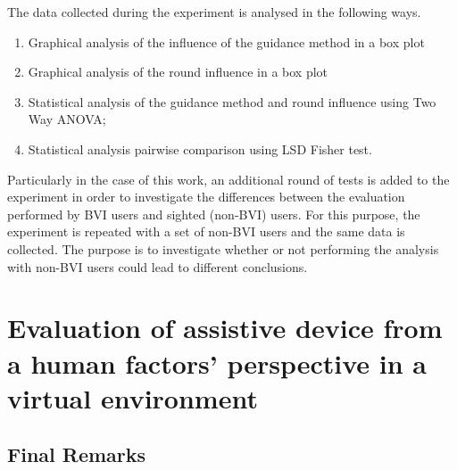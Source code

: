 The data collected during the experiment is analysed in the following ways. 

\begin{enumerate}
    \item Graphical analysis of the influence of the guidance method in a box plot
    \item Graphical analysis of the round influence in a box plot
    \item Statistical analysis of the guidance method and round influence using Two Way ANOVA;
    \item Statistical analysis pairwise comparison using LSD Fisher test.
\end{enumerate}

Particularly in the case of this work, an additional round of tests is added to the experiment in order to investigate the differences between the evaluation performed by BVI users and sighted (non-BVI) users. For this purpose, the experiment is repeated with a set of non-BVI users and the same data is collected. The purpose is to investigate whether or not performing the analysis with non-BVI users could lead to different conclusions.


%
%

\section{Evaluation of assistive device from a human factors’ perspective in a virtual environment}

%

 

\subsection{Final Remarks}

